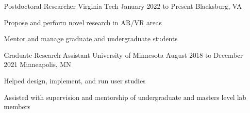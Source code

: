 
\begin{cventries}
  \cventry
    {Postdoctoral Researcher} %
    {Virginia Tech} %
    {January 2022 to Present} %
    {Blacksburg, VA} %
    {
      \begin{cvitems} %
        \item {Propose and perform novel research in AR/VR areas}
        \item {Mentor and manage graduate and undergraduate students}
      \end{cvitems}
    }
    
    
    
  \cventry
    {Graduate Research Assistant} %
    {University of Minnesota} %
    {August 2018 to December 2021} %
    {Minneapolis, MN} %
    {
      \begin{cvitems} %
        \item {Helped design, implement, and run user studies}
		\item {Assisted with supervision and mentorship of undergraduate and masters level lab members}
      \end{cvitems}
    }
    

\end{cventries}
